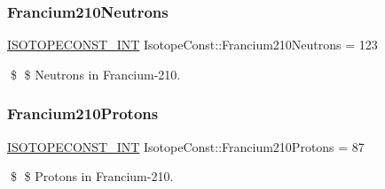 \subsubsection{\texorpdfstring{Francium210\+Neutrons}{Francium210Neutrons}}
{\footnotesize\ttfamily \mbox{\hyperlink{group___isotope_const-_macros_ga5f18360b3e99483a35c32d789e62621c}{I\+S\+O\+T\+O\+P\+E\+C\+O\+N\+S\+T\+\_\+\+I\+NT}} Isotope\+Const\+::\+Francium210\+Neutrons = 123}

\$ \$ Neutrons in Francium-\/210. \mbox{\label{group___isotope_const-_francium-_fr210_ga21c19cbf6296b7adaca98b2bf5ce6344}} 
\subsubsection{\texorpdfstring{Francium210\+Protons}{Francium210Protons}}
{\footnotesize\ttfamily \mbox{\hyperlink{group___isotope_const-_macros_ga5f18360b3e99483a35c32d789e62621c}{I\+S\+O\+T\+O\+P\+E\+C\+O\+N\+S\+T\+\_\+\+I\+NT}} Isotope\+Const\+::\+Francium210\+Protons = 87}

\$ \$ Protons in Francium-\/210. 
